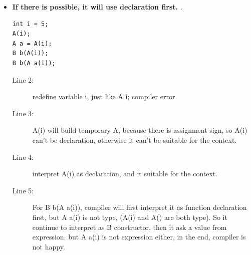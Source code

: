 \documentclass[a4paper,11pt,twoside]{book}
\begin{document}
\begin{itemize}
	\item \textbf{If there is possible, it will use declaration first. }.
\begin{lstlisting}
int i = 5;
A(i);
A a = A(i);
B b(A(i));
B b(A a(i));
\end{lstlisting}
\begin{description}
	\item[Line 2:] redefine variable i, just like A i; compiler error.
	
	\item[Line 3:] A(i) will build temporary A, because there is assignment sign, so A(i) can't be declaration, otherwise it can't be suitable for the context.
	
	\item[Line 4:] interpret A(i) as declaration, and it suitable for the context.
	
	\item[Line 5:] For B b(A a(i)), compiler will first interpret it as function declaration first, but A a(i) is not type, (A(i) and A() are both type). So it continue to interpret as B constructor, then it ask a value from expression. but A a(i) is not expression either, in the end, compiler is not happy. 
\end{description}

\end{itemize}
\end{document}
